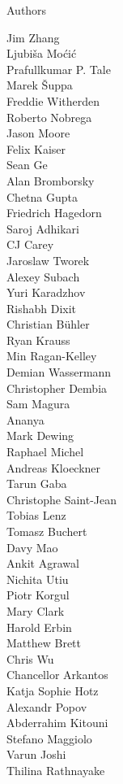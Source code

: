 \documentclass[xcolor=svgnames]{beamer}
\begin{document}
\begin{frame}{Authors}
\begin{multicols}{5}
    Jim Zhang\\
    Ljubiša Moćić\\
    Prafullkumar P. Tale\\
    Marek Šuppa\\
    Freddie Witherden\\
    Roberto Nobrega\\
    Jason Moore\\
    Felix Kaiser\\
    Sean Ge\\
    Alan Bromborsky\\
    Chetna Gupta\\
    Friedrich Hagedorn\\
    Saroj Adhikari\\
    CJ Carey\\
    Jaroslaw Tworek\\
    Alexey Subach\\
    Yuri Karadzhov\\
    Rishabh Dixit\\
    Christian Bühler\\
    Ryan Krauss\\
    Min Ragan-Kelley\\
    Demian Wassermann\\
    Christopher Dembia\\
    Sam Magura\\
    Ananya\\
    Mark Dewing\\
    Raphael Michel\\
    Andreas Kloeckner\\
    Tarun Gaba\\
    Christophe Saint-Jean\\
    Tobias Lenz\\
    Tomasz Buchert\\
    Davy Mao\\
    Ankit Agrawal\\
    Nichita Utiu\\
    Piotr Korgul\\
    Mary Clark\\
    Harold Erbin\\
    Matthew Brett\\
    Chris Wu\\
    Chancellor Arkantos\\
    Katja Sophie Hotz\\
    Alexandr Popov\\
    Abderrahim Kitouni\\
    Stefano Maggiolo\\
    Varun Joshi\\
    Thilina Rathnayake\\
  \end{multicols}
\end{frame}
\end{document}
